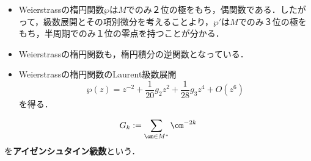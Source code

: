 \documentclass[uplatex, dvipdfmx]{jsreport}
\begin{document}
\begin{tcolorbox}[colframe=ForestGreen, colback=ForestGreen!10!white,breakable,colbacktitle=ForestGreen!40!white,coltitle=black,fonttitle=\bfseries\sffamily,
title=]
    \begin{itemize}
        \item Weierstrassの楕円関数$\wp$は$M$でのみ２位の極をもち，偶関数である．したがって，級数展開とその項別微分を考えることより，$\wp'$は$M$でのみ３位の極をもち，半周期でのみ１位の零点を持つことが分かる．
        \item Weierstrassの楕円関数も，楕円積分の逆関数となっている．
        \item Weierstrassの楕円関数のLaurent級数展開
        \[\wp(z)=z^{-2}+\frac{1}{20}g_2z^2+\frac{1}{28}g_3z^4+O(z^6)\]
        を得る．
    \end{itemize}
\end{tcolorbox}

\begin{definition}
    \[G_k:=\sum_{\om\in M^*}\om^{-2k}\]
    を\textbf{アイゼンシュタイン級数}という．
\end{definition}
\end{document}
